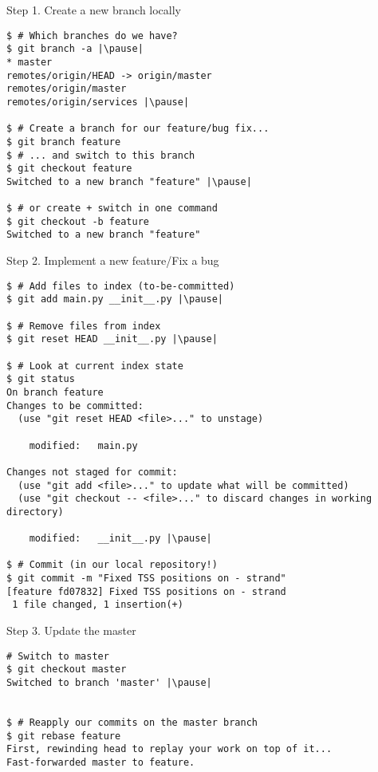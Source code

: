 \begin{frame}[fragile]{Step 1. Create a new branch locally}
	\begin{lstlisting}
$ # Which branches do we have?
$ git branch -a |\pause|
* master
remotes/origin/HEAD -> origin/master
remotes/origin/master
remotes/origin/services |\pause|

$ # Create a branch for our feature/bug fix...
$ git branch feature
$ # ... and switch to this branch
$ git checkout feature 
Switched to a new branch "feature" |\pause|

$ # or create + switch in one command
$ git checkout -b feature 
Switched to a new branch "feature"
  	\end{lstlisting}
\end{frame}

\begin{frame}[fragile]{Step 2. Implement a new feature/Fix a bug}
  	\begin{lstlisting}
$ # Add files to index (to-be-committed)
$ git add main.py __init__.py |\pause|

$ # Remove files from index
$ git reset HEAD __init__.py |\pause|

$ # Look at current index state
$ git status
On branch feature
Changes to be committed:
  (use "git reset HEAD <file>..." to unstage)

	modified:   main.py

Changes not staged for commit:
  (use "git add <file>..." to update what will be committed)
  (use "git checkout -- <file>..." to discard changes in working directory)

	modified:   __init__.py |\pause|

$ # Commit (in our local repository!)
$ git commit -m "Fixed TSS positions on - strand"
[feature fd07832] Fixed TSS positions on - strand
 1 file changed, 1 insertion(+)
  	\end{lstlisting}
\end{frame}


\begin{frame}[fragile]{Step 3. Update the master}
  	\begin{lstlisting}
# Switch to master
$ git checkout master
Switched to branch 'master' |\pause|


$ # Reapply our commits on the master branch
$ git rebase feature
First, rewinding head to replay your work on top of it...
Fast-forwarded master to feature.
	\end{lstlisting}
\end{frame}

